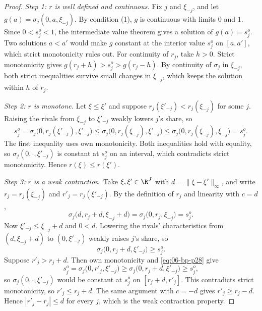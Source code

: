 \begin{proof}
\emph{Step 1: $r$ is well defined and continuous.} Fix $j$ and $\xi_{-j}$, and let $g(a) = \sigma_j(0, a, \xi_{-j})$. By
condition (1), $g$ is continuous with limits $0$ and $1$. Since $0 < s^o_j < 1$, the intermediate value theorem gives a
solution of $g(a) = s^o_j$. Two solutions $a < a'$ would make $g$ constant at the interior value $s^o_j$ on $[a, a']$,
which strict monotonicity rules out. For continuity of $r_j$, take $h > 0$. Strict monotonicity gives $g(r_j + h) > s^o_j > g(r_j - h)$. By
continuity of $\sigma_j$ in $\xi_{-j}$, both strict inequalities survive small changes in $\xi_{-j}$, which keeps the
solution within $h$ of $r_j$.

\emph{Step 2: $r$ is monotone.} Let $\xi \le \xi'$ and suppose $r_j(\xi'_{-j}) < r_j(\xi_{-j})$ for some $j$. Raising the
rivals from $\xi_{-j}$ to $\xi'_{-j}$ weakly lowers $j$'s share, so
\begin{equation*}
  s^o_j = \sigma_j\bigl(0, r_j(\xi'_{-j}), \xi'_{-j}\bigr) \le \sigma_j\bigl(0, r_j(\xi_{-j}), \xi'_{-j}\bigr)
  \le \sigma_j\bigl(0, r_j(\xi_{-j}), \xi_{-j}\bigr) = s^o_j .
\end{equation*}
The first inequality uses own monotonicity. Both inequalities hold with equality, so $\sigma_j(0, \cdot, \xi'_{-j})$ is
constant at $s^o_j$ on an interval, which contradicts strict monotonicity. Hence $r(\xi) \le r(\xi')$.

\emph{Step 3: $r$ is a weak contraction.} Take $\xi, \xi' \in \R^J$ with $d = \lVert \xi - \xi' \rVert_\infty$, and write
$r_j = r_j(\xi_{-j})$ and $r'_j = r_j(\xi'_{-j})$. By the definition of $r_j$ and linearity with $c = d$,
\begin{equation}\label{eq:06-bp-p27}
  \sigma_j\bigl(d, r_j + d, \xi_{-j} + d\bigr) = \sigma_j\bigl(0, r_j, \xi_{-j}\bigr) = s^o_j .
\end{equation}
Now $\xi'_{-j} \le \xi_{-j} + d$ and $0 < d$. Lowering the rivals' characteristics from $(d, \xi_{-j} + d)$ to $(0,
\xi'_{-j})$ weakly raises $j$'s share, so
\begin{equation}\label{eq:06-bp-p28}
  \sigma_j\bigl(0, r_j + d, \xi'_{-j}\bigr) \ge s^o_j .
\end{equation}
Suppose $r'_j > r_j + d$. Then own monotonicity and \eqref{eq:06-bp-p28} give
\begin{equation*}
  s^o_j = \sigma_j\bigl(0, r'_j, \xi'_{-j}\bigr) \ge \sigma_j\bigl(0, r_j + d, \xi'_{-j}\bigr) \ge s^o_j ,
\end{equation*}
so $\sigma_j(0, \cdot, \xi'_{-j})$ would be constant at $s^o_j$ on $[r_j + d, r'_j]$. This contradicts strict
monotonicity, so $r'_j \le r_j + d$. The same argument with $c = -d$ gives $r'_j \ge r_j - d$. Hence $|r'_j - r_j| \le d$
for every $j$, which is the weak contraction property.


\end{proof}
